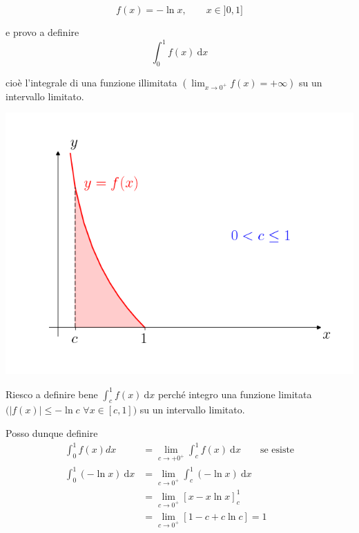 	
\begin{exbar}
\begin{example}
	\begin{equation*}
		f(x)=-\ln x, \qquad x \in ]0,1]
	\end{equation*}
	
	e provo a definire 
	\begin{equation*}
		\int_{0}^{1} f(x) \ \mathrm{d}x
	\end{equation*}
	
	cioè l'integrale di una funzione illimitata $\left( \lim_{x \rightarrow 0^+} f(x) = + \infty \right)$ su un intervallo limitato.
	\begin{center}
		\includegraphics[width=0.75\linewidth]{integrali_impropri/pag79}
		\label{fig:pag79}
	\end{center}
	
	Riesco a definire bene $\int_{c}^{1} f(x) \ \mathrm{d}x$ perché integro una funzione limitata
	$( |f(x)|\leq -\ln c$ $\forall x \in [c,1] )$ su un intervallo limitato.
	
	Posso dunque definire
	\begin{align*}
		\int_{0}^{1} f(x)dx 
		&= \lim_{c\rightarrow +0^+} \int_{c}^{1} f(x) \ \mathrm{d}x \qquad \text{se esiste}
		\\
		\int_{0}^{1}(-\ln x) \ \mathrm{d}x 
		&= \lim_{c \rightarrow 0^+} \int_{c}^{1} (-\ln x) \ \mathrm{d} x
		\\
		&= \lim_{c \rightarrow 0^+} [x-x\ln x]_{c}^{1} 
		\\
		&= \lim_{c \rightarrow 0^+} [1-c+c\ln c]=1
	\end{align*}
\end{example}
\end{exbar}

